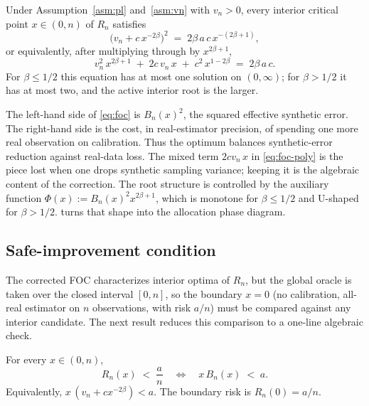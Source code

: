 \begin{proposition}\label{prop:foc}
  Under Assumption~\ref{asm:pl} and~\ref{asm:vn} with $v_n>0$, every interior critical point $x\in(0,n)$ of $R_n$ satisfies
  \begin{equation}\label{eq:foc}
    \bigl(v_n+c\,x^{-2\beta}\bigr)^2\;=\;2\beta\,a\,c\,x^{-(2\beta+1)},
  \end{equation}
  or equivalently, after multiplying through by $x^{2\beta+1}$,
  \begin{equation}\label{eq:foc-poly}
    v_n^2\,x^{2\beta+1}\;+\;2c\,v_n\,x\;+\;c^2\,x^{1-2\beta}\;=\;2\beta\,a\,c.
  \end{equation}
  For $\beta\le 1/2$ this equation has at most one solution on $(0,\infty)$; for $\beta>1/2$ it has at most two, and the active interior root is the larger.
\end{proposition}

The left-hand side of \cref{eq:foc} is $B_n(x)^2$, the squared effective synthetic error. The right-hand side is the cost, in real-estimator precision, of spending one more real observation on calibration. Thus the optimum balances synthetic-error reduction against real-data loss. The mixed term $2cv_n\,x$ in \cref{eq:foc-poly} is the piece lost when one drops synthetic sampling variance; keeping it is the algebraic content of the correction. The root structure is controlled by the auxiliary function $\Phi(x):=B_n(x)^2 x^{2\beta+1}$, which is monotone for $\beta\le 1/2$ and U-shaped for $\beta>1/2$.  turns that shape into the allocation phase diagram.

\subsection{Safe-improvement condition}\label{ssec:safe}

The corrected FOC characterizes interior optima of $R_n$, but the global oracle is taken over the closed interval $[0,n]$, so the boundary $x=0$ (no calibration, all-real estimator on $n$ observations, with risk $a/n$) must be compared against any interior candidate. The next result reduces this comparison to a one-line algebraic check.

\begin{proposition}\label{prop:safe}
  For every $x\in(0,n)$,
  \begin{equation}\label{eq:safe}
    R_n(x)\;<\;\frac{a}{n}\quad\Longleftrightarrow\quad x\,B_n(x)\;<\;a.
  \end{equation}
  Equivalently, $x\,(v_n+cx^{-2\beta})<a$. The boundary risk is $R_n(0)=a/n$.
\end{proposition}

